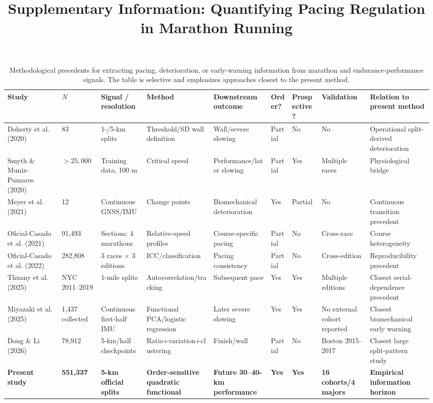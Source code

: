 \documentclass[pdflatex,sn-basic]{sn-jnl}
\begin{document}
\title{Supplementary Information: Quantifying Pacing Regulation in Marathon Running}
\author*[1]{ }
\maketitle
\begin{table}[ht]
\centering
\caption{Methodological precedents for extracting pacing, deterioration, or early-warning information from marathon and endurance-performance signals. The table is selective and emphasizes approaches closest to the present method.}
\label{tab:evidence_map}
\scriptsize
\begin{tabular}{p{2.25cm}p{1.15cm}p{2.2cm}p{2.4cm}p{2.35cm}p{1.0cm}p{1.25cm}p{1.7cm}p{2.8cm}}
\toprule
Study & $N$ & Signal / resolution & Method & Downstream outcome & Order? & Prospective? & Validation & Relation to present method\\
\midrule
Doherty et al. (2020) & 83 & 1-/5-km splits & Threshold/SD wall definition & Wall/severe slowing & Partial & No & No & Operational split-derived deterioration\\
Smyth \& Muniz-Pumares (2020) & $>25{,}000$ & Training data, 100 m & Critical speed & Performance/later slowing & Partial & Yes & Multiple races & Physiological bridge\\
Meyer et al. (2021) & 12 & Continuous GNSS/IMU & Change points & Biomechanical deterioration & Yes & Partial & No & Continuous transition precedent\\
Oficial-Casado et al. (2021) & 91,493 & Sections; 4 marathons & Relative-speed profiles & Course-specific pacing & Partial & No & Cross-race & Course heterogeneity\\
Oficial-Casado et al. (2022) & 282,808 & 3 races $\times$ 3 editions & ICC/classification & Pacing consistency & Partial & No & Cross-edition & Reproducibility precedent\\
Thuany et al. (2025) & NYC 2011--2019 & 1-mile splits & Autocorrelation/tracking & Subsequent pace & Yes & Yes & Multiple editions & Closest serial-dependence precedent\\
Miyazaki et al. (2025) & 1,437 collected & Continuous first-half IMU & Functional PCA/logistic regression & Later severe slowing & Yes & Yes & No external cohort reported & Closest biomechanical early warning\\
Dong \& Li (2026) & 78,912 & 5-km/half checkpoints & Ratio+variation+clustering & Finish/wall & Partial & No & Boston 2015--2017 & Closest large split-pattern study\\
\textbf{Present study} & \textbf{551,337} & \textbf{5-km official splits} & \textbf{Order-sensitive quadratic functional} & \textbf{Future 30--40-km performance} & \textbf{Yes} & \textbf{Yes} & \textbf{16 cohorts/4 majors} & \textbf{Empirical information horizon}\\
\bottomrule
\end{tabular}
\end{table}
\end{document}
